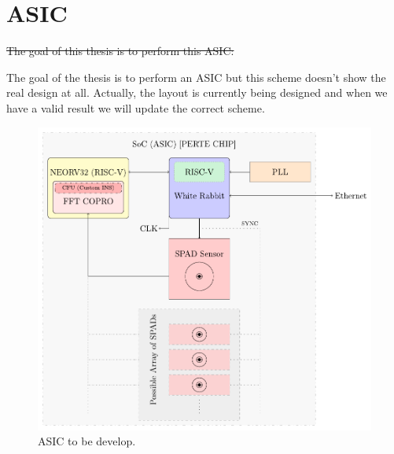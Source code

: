 \newpage
\section{ASIC}
\label{asic}

\st{The goal of this thesis is to perform this ASIC:}

\noindent The goal of the thesis is to perform an ASIC but this scheme doesn't show the real design at all.
Actually, the layout is currently being designed and when we have a valid result we will update the correct scheme.

\begin{figure}[H]
    \centering
    \includegraphics[width=14cm]{figures/ASIC-Scheme.pdf}
    \caption{ASIC to be develop.}
    \label{fig:ASIC}
\end{figure}
